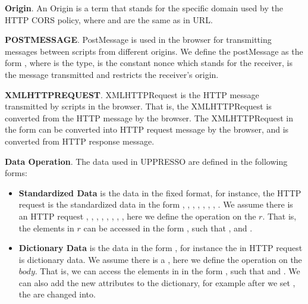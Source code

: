 \begin{appendices}
\vspace{1mm}\noindent\textbf{Origin}.
An Origin is a term  that stands for the specific domain used by the HTTP CORS policy, where  and  are the same as in URL.

\vspace{1mm}\noindent\textbf{POSTMESSAGE}.
PostMessage is used in the browser for transmitting messages between scripts from different origins. We define the postMessage as the form , where  is the type,  is the constant nonce which stands for the receiver,  is the message transmitted and  restricts the receiver's origin.

\vspace{1mm}\noindent\textbf{XMLHTTPREQUEST}.
XMLHTTPRequest is the HTTP message transmitted  by scripts in the browser. That is, the XMLHTTPRequest is converted from the HTTP message by the browser. The XMLHTTPRequest in the form  can be converted into HTTP request message by the browser, and   is converted from HTTP response message.

\vspace{1mm}\noindent\textbf{Data Operation}.
The data used in UPPRESSO are defined in the following forms:
\begin{itemize}
\item \textbf{Standardized Data} is the data in the fixed format, for instance, the HTTP request is the standardized data in the form , , , , , , , .  We assume there is an HTTP request   ,  ,  ,  ,  ,  \myss{\myangle{}},  \myss{\myangle{}},  \myss{\myangle{}\rangle}, here we define the operation on the $r$. That is, the elements in $r$ can be accessed in the form , such that ,   and .
\item \textbf{Dictionary Data} is the data in the form , for instance the  in HTTP request is dictionary data. We assume there is a , here we define the operation on the $body$. That is, we can access the elements in  in the form , such that  and . We can also add the new attributes to the dictionary, for example after we set , the  are changed into.
\end{itemize}


\end{appendices}
